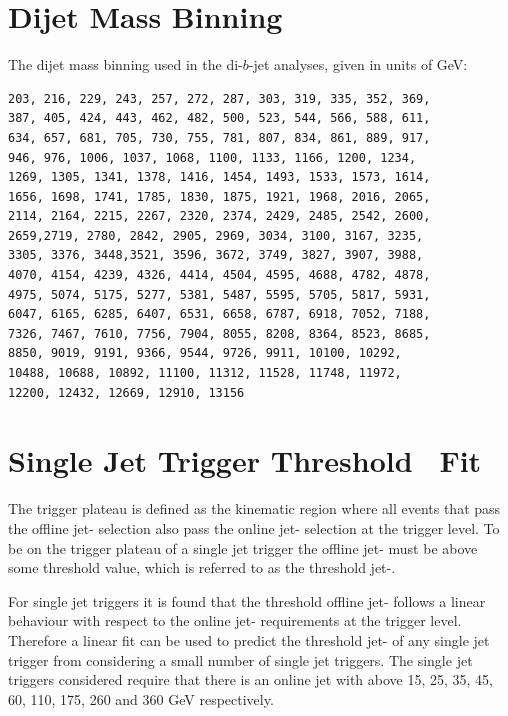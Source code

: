 
\appendix

\clearpage
{}
{}
\chapter{Dijet Mass Binning}
\label{app:dijet_bins}

\noindent
The dijet mass binning used in the di-$b$-jet analyses, given in units of GeV:
\begin{verbatim}
203, 216, 229, 243, 257, 272, 287, 303, 319, 335, 352, 369,
387, 405, 424, 443, 462, 482, 500, 523, 544, 566, 588, 611, 
634, 657, 681, 705, 730, 755, 781, 807, 834, 861, 889, 917,
946, 976, 1006, 1037, 1068, 1100, 1133, 1166, 1200, 1234, 
1269, 1305, 1341, 1378, 1416, 1454, 1493, 1533, 1573, 1614,
1656, 1698, 1741, 1785, 1830, 1875, 1921, 1968, 2016, 2065, 
2114, 2164, 2215, 2267, 2320, 2374, 2429, 2485, 2542, 2600, 
2659,2719, 2780, 2842, 2905, 2969, 3034, 3100, 3167, 3235, 
3305, 3376, 3448,3521, 3596, 3672, 3749, 3827, 3907, 3988, 
4070, 4154, 4239, 4326, 4414, 4504, 4595, 4688, 4782, 4878, 
4975, 5074, 5175, 5277, 5381, 5487, 5595, 5705, 5817, 5931, 
6047, 6165, 6285, 6407, 6531, 6658, 6787, 6918, 7052, 7188, 
7326, 7467, 7610, 7756, 7904, 8055, 8208, 8364, 8523, 8685, 
8850, 9019, 9191, 9366, 9544, 9726, 9911, 10100, 10292, 
10488, 10688, 10892, 11100, 11312, 11528, 11748, 11972, 
12200, 12432, 12669, 12910, 13156
\end{verbatim}


\chapter{Single Jet Trigger Threshold~\pT{} Fit}
\label{app:triggerTurnOn_fit}

The trigger plateau is defined as the kinematic region where all events that pass the offline jet-\pT{} selection
also pass the online jet-\pT{} selection at the trigger level.
To be on the trigger plateau of a single jet trigger
the offline jet-\pT{} must be above some threshold value,
which is referred to as the threshold jet-\pT{}.

For single jet triggers it is found that the threshold offline jet-\pT{} follows
a linear behaviour with respect to the online jet-\pT{} requirements at the trigger level.
Therefore a linear fit can be used to predict the threshold jet-\pT{} of any single jet trigger
from considering a small number of single jet triggers.
The single jet triggers considered require that there is an online jet with \pT{} above
15, 25, 35, 45, 60, 110, 175, 260 and 360 GeV respectively.

